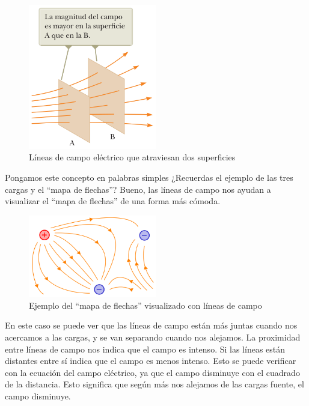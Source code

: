 \begin{figure}[ht]
    \centering
    \includegraphics[width=0.5\textwidth]{images/field-lines.png}
    \caption{Líneas de campo eléctrico que atraviesan dos superficies}
    \label{fig:lineas_de_campo}
\end{figure}

Pongamos este concepto en palabras simples ¿Recuerdas el ejemplo de las tres cargas y el ``mapa de flechas''? Bueno, las líneas de campo nos ayudan a visualizar el ``mapa de flechas'' de una forma más cómoda.

\begin{figure}[ht]
    \centering
    \includegraphics[width=0.5\textwidth]{images/field_lines_ex.png}
    \caption{Ejemplo del ``mapa de flechas'' visualizado con líneas de campo}
    \label{fig:ej_lineas_de_campo}
\end{figure}

En este caso se puede ver que las líneas de campo están más juntas cuando nos acercamos a las cargas, y se van separando cuando nos alejamos. La proximidad entre líneas de campo nos indica que el campo es intenso. Si las líneas están distantes entre sí indica que el campo es menos intenso. Esto se puede verificar con la ecuación del campo eléctrico, ya que el campo disminuye con el cuadrado de la distancia. Esto significa que según más nos alejamos de las cargas fuente, el campo disminuye.

